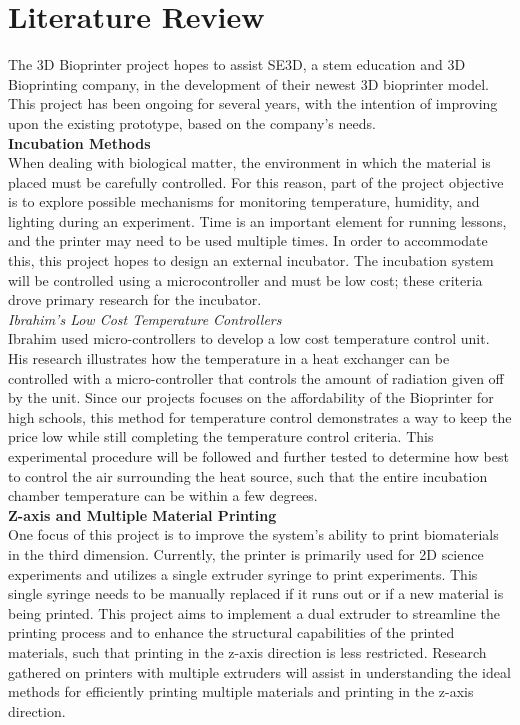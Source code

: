 \section{Literature Review}

The 3D Bioprinter project hopes to assist SE3D, a stem education and 3D Bioprinting company, in the development of their newest 3D bioprinter model. This project has been ongoing for several years, with the intention of improving upon the existing prototype, based on the company’s needs. 
\\
\textbf{Incubation Methods}
\\
When dealing with biological matter, the environment in which the material is placed must be carefully controlled. For this reason, part of the project objective is to explore possible mechanisms for monitoring temperature, humidity, and lighting during an experiment. Time is an important element for running lessons, and the printer may need to be used multiple times. In order to accommodate this, this project hopes to design an external incubator. The incubation system will be controlled using a microcontroller and must be low cost; these criteria drove primary research for the incubator.
\\
\textit{Ibrahim’s Low Cost Temperature Controllers}
\\
Ibrahim used micro-controllers to develop a low cost temperature control unit. His research illustrates how the temperature in a heat exchanger can be controlled with a micro-controller that controls the amount of radiation given off by the unit.  Since our projects focuses on the affordability of the Bioprinter for high schools, this method for temperature control demonstrates a way to keep the price low while still completing the temperature control criteria. This experimental procedure will be followed and further tested to determine how best to control the air surrounding the heat source, such that the entire incubation chamber temperature can be within a few degrees.
\\
\textbf{Z-axis and Multiple Material Printing}
\\
One focus of this project is to improve the system’s ability to print biomaterials in the third dimension. Currently, the printer is primarily used for 2D science experiments and utilizes a single extruder syringe to print experiments. This single syringe needs to be manually replaced if it runs out or if a new material is being printed. This project aims to implement a dual extruder to streamline the printing process and to enhance the structural capabilities of the printed materials, such that printing in the z-axis direction is less restricted. Research gathered on printers with multiple extruders will assist in understanding the ideal methods for efficiently printing multiple materials and printing in the z-axis direction.
